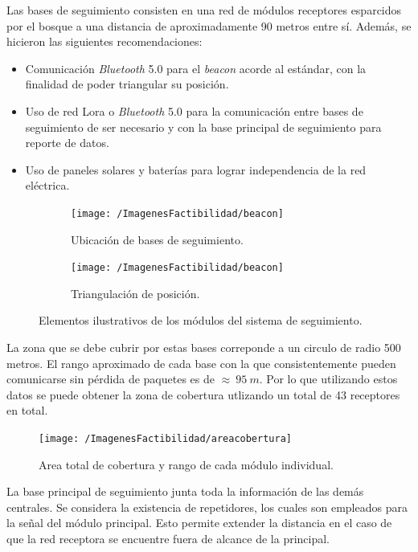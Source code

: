 Las bases de seguimiento consisten en una red de módulos receptores esparcidos por el bosque a una distancia de aproximadamente 90 metros entre sí.
Además, se hicieron las siguientes recomendaciones:
\begin{itemize}
	\item Comunicación \textit{Bluetooth} 5.0 para el \textit{beacon} acorde al estándar, con la finalidad de poder triangular su posición.
	\item Uso de red Lora o \textit{Bluetooth} 5.0 para la comunicación entre bases de seguimiento de ser necesario y con la base principal de seguimiento para reporte de datos.
	\item Uso de paneles solares y baterías para lograr independencia de la red eléctrica.
\end{itemize}
\begin{figure}[H]
\centering
	\begin{subfigure}{0.5\textwidth}
    	\centering
    	\texttt{[image: /ImagenesFactibilidad/beacon]}
  		\caption{Ubicación de bases de seguimiento.}
  		\label{fig:sfig1}
    \end{subfigure}\hfill
    \begin{subfigure}{0.5\textwidth}
    	\centering
    	\texttt{[image: /ImagenesFactibilidad/beacon]}
  		\caption{Triangulación de posición.}
  		\label{fig:sfig2}
    \end{subfigure}
	\caption{Elementos ilustrativos de los módulos del sistema de seguimiento.}
	\label{fig:componentes_beacon}
\end{figure}
La zona que se debe cubrir por estas bases correponde a un circulo de radio 500 metros. El rango aproximado de cada base con la que consistentemente pueden comunicarse sin pérdida de paquetes es de $\approx \ 95 \ m$. Por lo que utilizando estos datos se puede obtener la zona de cobertura utlizando un total de 43 receptores en total.
\begin{figure}[H]
\centering
    	\texttt{[image: /ImagenesFactibilidad/areacobertura]}
	\caption{Area total de cobertura y rango de cada módulo individual.}
	\label{fig:Areatotal}
\end{figure}
La base principal de seguimiento junta toda la información de las demás centrales. Se considera la existencia de repetidores, los cuales son empleados para la señal del módulo principal. Esto permite extender la distancia en el caso de que la red receptora se encuentre fuera de alcance de la principal.


